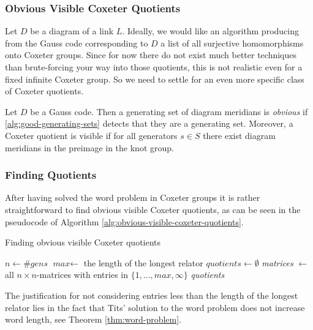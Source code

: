 \documentclass[a4paper]{article}
\theoremstyle{definition}
\begin{document}
\subsubsection{Obvious Visible Coxeter Quotients}
Let $D$ be a diagram of a link $L$. Ideally, we would like an algorithm producing from the Gauss code corresponding to $D$ a list of all surjective homomorphisms onto Coxeter groups. Since for now there do not exist much better techniques than brute-forcing your way into those quotients, this is not realistic even for a fixed infinite Coxeter group. So we need to settle for an even more specific class of Coxeter quotients.

Let $D$ be a Gauss code. Then a generating set of diagram meridians is \textit{obvious} if \ref{alg:good-generating-sets} detects that they are a generating set. Moreover, a Coxeter quotient is visible if for all generators $s \in S$ there exist diagram meridians in the preimage in the knot group.

\subsubsection{Finding Quotients}
After having solved the word problem in Coxeter groups it is rather straightforward to find obvious visible Coxeter quotients, as can be seen in the pseudocode of Algorithm \ref{alg:obvious-visible-coxeter-quotients}.
\begin{algorithm}\label{alg:obvious-visible-coxeter-quotients}
\caption{Finding obvious visible Coxeter quotients}
$n \leftarrow \#\textit{gens}$\;
$\textit{max} \leftarrow $ the length of the longest relator\;
$\textit{quotients} \leftarrow \emptyset$\;
\textit{matrices} $ \leftarrow $ all $n \times n$-matrices with entries in $\{1, \dots, \textit{max}, \infty \}$\;
\Return \textit{quotients}
\end{algorithm}

The justification for not considering entries less than the length of the longest relator lies in the fact that Tits' solution to the word problem does not increase word length, see Theorem \ref{thm:word-problem}. 
\newpage



\end{document}

